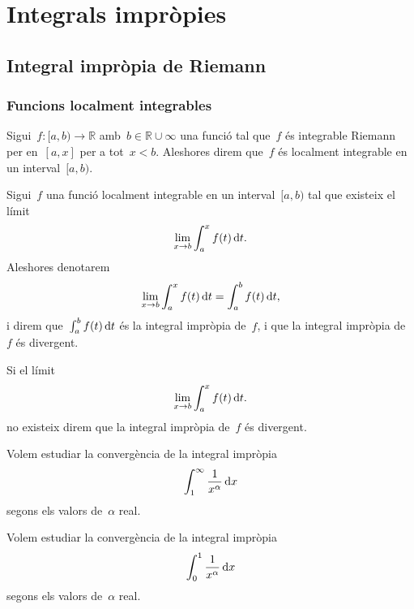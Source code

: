 \documentclass[../analisi-matematica.tex]{subfiles}
\begin{document}
\chapter{Integrals impròpies}
\section{Integral impròpia de Riemann}
    \subsection{Funcions localment integrables}
    \begin{definition}
        \label{def:funcio-localment-integrable}
        Sigui~\(f\colon[a,b)\longrightarrow\mathbb{R}\) amb~\(b\in\mathbb{R}\cup\infty\) una funció tal que~\(f\) és integrable Riemann per en~\([a,x]\) per a tot~\(x<b\).
        Aleshores direm que~\(f\) és localment integrable en un interval~\([a,b)\).
    \end{definition}
    \begin{definition}
        \label{def:integral-impropia}
        \label{def:integral-impropia-convergent}
        \label{def:integral-impropia-divergent}
        Sigui~\(f\) una funció localment integrable en un interval~\([a,b)\) tal que existeix el límit
        \[
            \lim_{x\to b}\int_{a}^{x}f(t)\mathop{}\!\mathrm{d} t.
        \]
        Aleshores denotarem
        \[
            \lim_{x\to b}\int_{a}^{x}f(t)\mathop{}\!\mathrm{d} t=\int_{a}^{b}f(t)\mathop{}\!\mathrm{d} t,
        \]
        i direm que~\(\int_{a}^{b}f(t)\mathop{}\!\mathrm{d} t\) és la integral impròpia de~\(f\), i que la integral impròpia de~\(f\) és divergent.

        Si el límit
        \[
            \lim_{x\to b}\int_{a}^{x}f(t)\mathop{}\!\mathrm{d} t.
        \]
        no existeix direm que la integral impròpia de~\(f\) és divergent.
    \end{definition}
    \begin{example}
        \label{ex:funcio-de-la-serie-harmonica-en-integrals-impropies-entre-1-i-infinit}
        Volem estudiar la convergència de la integral impròpia
        \[
            \int_{1}^{\infty}\frac{1}{x^{\alpha}}\mathop{}\!\mathrm{d} x
        \]
        segons els valors de~\(\alpha\) real.
    \end{example}
    \begin{solution}
    \end{solution}
    \begin{example}
        \label{ex:funcio-de-la-serie-harmonica-en-integrals-impropies-entre-0-i-1}
        Volem estudiar la convergència de la integral impròpia
        \[
            \int_{0}^{1}\frac{1}{x^{\alpha}}\mathop{}\!\mathrm{d} x
        \]
        segons els valors de~\(\alpha\) real.
    \end{example}
    \begin{solution}
    \end{solution}
\end{document}
